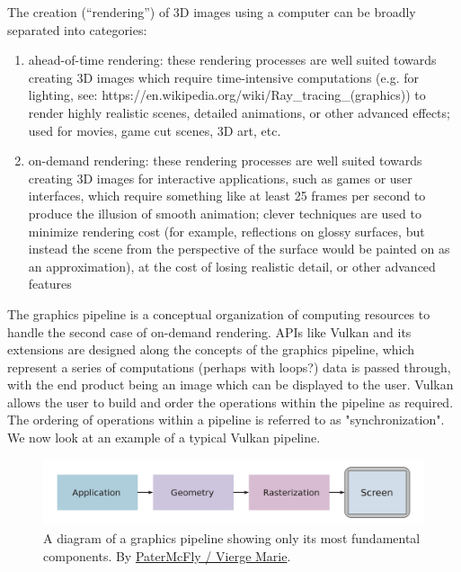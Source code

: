 \documentclass[12pt,letterpaper]{article}
\newcommand{\inquotes}[1]{``#1''}	%
\begin{document}
    The creation (\inquotes{rendering}) of 3D images using a computer can be broadly separated into categories:
        \begin{enumerate}
            \item ahead-of-time rendering: these rendering processes are well suited towards creating 3D images which require time-intensive computations (e.g. for lighting, see: https://en.wikipedia.org/wiki/Ray_tracing_(graphics)) to render highly realistic scenes, detailed animations, or other advanced effects; used for movies, game cut scenes, 3D art, etc.
            
            \item on-demand rendering: these rendering processes are well suited towards creating 3D images for interactive applications, such as games or user interfaces, which require something like at least 25 frames per second to produce the illusion of smooth animation; clever techniques are used to minimize rendering cost (for example, reflections on glossy surfaces, but instead the scene from the perspective of the surface would be painted on as an approximation), at the cost of losing realistic detail, or other advanced features
        \end{enumerate}

    
    The graphics pipeline is a conceptual organization of computing resources to handle the second case of on-demand rendering. APIs like Vulkan and its extensions are designed along the concepts of the graphics pipeline, which represent a series of computations (perhaps with loops?) data is passed through, with the end product being an image which can be displayed to the user. Vulkan allows the user to build and order the operations within the pipeline as required. The ordering of operations within a pipeline is referred to as "synchronization". We now look at an example of a typical Vulkan pipeline.
    
    \begin{figure}
        \centering
        \includegraphics[width=0.7\linewidth]{Graphics_pipeline_2_en.svg}
        \caption{A diagram of a graphics pipeline showing only its most fundamental components. By \href{https://commons.wikimedia.org/wiki/File:Graphics_pipeline_2_en.svg}{PaterMcFly / Vierge Marie}.}
        \label{fig:graphicspipeline2en}
    \end{figure}
    
\end{document}
